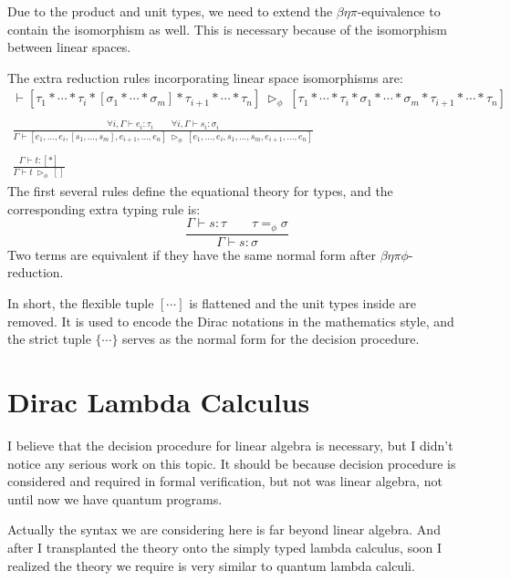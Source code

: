 Due to the product and unit types, we need to extend the $\beta\eta\pi$-equivalence to contain the isomorphism as well. This is necessary because of the isomorphism between linear spaces.
\begin{definition}
  \label{def:STLC_flexible_tuple_red}
  The extra reduction rules incorporating linear space isomorphisms are:
  \begin{gather*}
      \vdash [\tau_1 * \cdots * \tau_i * [\sigma_1 * \cdots * \sigma_m] * \tau_{i+1} * \cdots * \tau_n] \ \triangleright_\phi\ [\tau_1 * \cdots * \tau_i * \sigma_1 * \cdots * \sigma_m * \tau_{i+1} * \cdots * \tau_n]\\
      \ \\        
      \frac{\forall i, \Gamma \vdash e_i : \tau_i \qquad \forall i, \Gamma \vdash s_i : \sigma_i}{\Gamma \vdash [e_1, \dots, e_i, [s_1, \dots, s_m], e_{i+1}, \dots, e_n] \ \triangleright_\phi\ [e_1, \dots, e_i, s_1, \dots, s_m, e_{i+1}, \dots, e_n]}\\
      \ \\
      \frac{\Gamma \vdash t : [*]}{\Gamma \vdash t\ \triangleright_\phi\ []}
  \end{gather*}
  The first several rules define the equational theory for types, and the corresponding extra typing rule is:
  $$
  \frac{\Gamma \vdash s : \tau\qquad \tau =_\phi \sigma}{\Gamma \vdash s : \sigma}
  $$
  Two terms are equivalent if they have the same normal form after $\beta\eta\pi\phi$-reduction.
\end{definition}

In short, the flexible tuple $[\cdots]$ is flattened and the unit types inside are removed. It is used to encode the Dirac notations in the mathematics style, and the strict tuple $\{\cdots\}$ serves as the normal form for the decision procedure.


\section{Dirac Lambda Calculus}

I believe that the decision procedure for linear algebra is necessary, but I didn't notice any serious work on this topic. It should be because decision procedure is considered and required in formal verification, but not was linear algebra, not until now we have quantum programs. 

Actually the syntax we are considering here is far beyond linear algebra.
And after I transplanted the theory onto the simply typed lambda calculus, soon I realized the theory we require is very similar to quantum lambda calculi.


